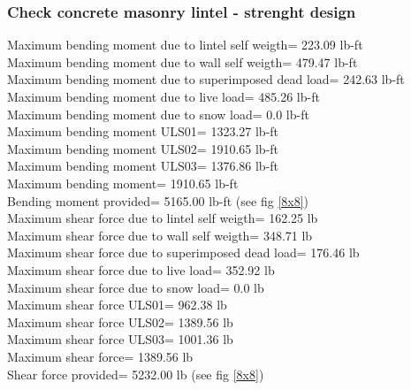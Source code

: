 \subsubsection{Check concrete masonry lintel - strenght design}
Maximum bending moment due to lintel self weigth=  223.09 lb-ft \\
Maximum bending moment due to wall self weigth=  479.47 lb-ft \\
Maximum bending moment due to superimposed dead load=  242.63 lb-ft \\
Maximum bending moment due to live load=  485.26 lb-ft \\
Maximum bending moment due to snow load=  0.0 lb-ft \\
Maximum bending moment ULS01=  1323.27 lb-ft \\
Maximum bending moment ULS02=  1910.65 lb-ft \\
Maximum bending moment ULS03=  1376.86 lb-ft \\
Maximum bending moment=  1910.65 lb-ft \\
Bending moment provided= 5165.00 lb-ft (see fig \ref{8x8}) \\
Maximum shear force due to lintel self weigth=  162.25 lb \\
Maximum shear force due to wall self weigth=  348.71 lb \\
Maximum shear force due to superimposed dead load=  176.46 lb \\
Maximum shear force due to live load=  352.92 lb \\
Maximum shear force due to snow load=  0.0 lb \\
Maximum shear force ULS01=  962.38 lb \\
Maximum shear force ULS02=  1389.56 lb \\
Maximum shear force ULS03=  1001.36 lb \\
Maximum shear force=  1389.56 lb \\
Shear force provided= 5232.00 lb (see fig \ref{8x8}) \\

